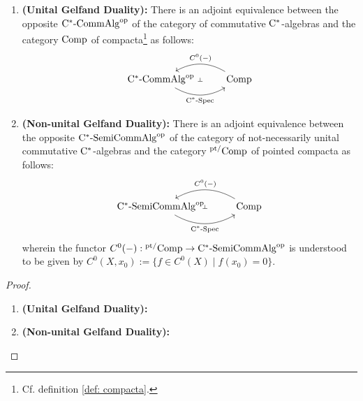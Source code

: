             \begin{theorem} \label{theorem: gelfand_duality}
                \noindent
                \begin{enumerate}
                    \item \textbf{(Unital Gelfand Duality):} There is an adjoint equivalence between the opposite $\mathrm{C}^*\text{-}\mathrm{Comm}\mathrm{Alg}^{\mathrm{op}}$ of the category of commutative $\mathrm{C}^*$-algebras and the category $\mathrm{Comp}$ of compacta\footnote{Cf. definition \ref{def: compacta}.} as follows:
                        $$
                            \begin{tikzcd}
                            	{\rmC^*\-\Comm\Alg^{\op}} & \Comp
                            	\arrow[""{name=0, anchor=center, inner sep=0}, "{\rmC^*\-\Spec}"', bend right, from=1-1, to=1-2]
                            	\arrow[""{name=1, anchor=center, inner sep=0}, "{C^0(-)}"', bend right, from=1-2, to=1-1]
                            	\arrow["\dashv"{anchor=center, rotate=-90}, draw=none, from=1, to=0]
                            \end{tikzcd}
                        $$
                    \item \textbf{(Non-unital Gelfand Duality):} There is an adjoint equivalence between the opposite $\mathrm{C}^*\text{-}\mathrm{Semi}\mathrm{Comm}\mathrm{Alg}^{\mathrm{op}}$ of the category of not-necessarily unital commutative $\mathrm{C}^*$-algebras and the category ${}^{\mathrm{pt}/}\mathrm{Comp}$ of pointed compacta as follows:
                        $$
                            \begin{tikzcd}
                            	{\rmC^*\-\Semi\Comm\Alg^{\op}} & { \Comp}
                            	\arrow[""{name=0, anchor=center, inner sep=0}, "{\rmC^*\-\Spec}"', bend right, from=1-1, to=1-2]
                            	\arrow[""{name=1, anchor=center, inner sep=0}, "{C^0(-)}"', bend right, from=1-2, to=1-1]
                            	\arrow["\dashv"{anchor=center, rotate=-90}, draw=none, from=1, to=0]
                            \end{tikzcd}
                        $$
                    wherein the functor $C^0(-): {}^{\mathrm{pt}/}\mathrm{Comp} \to \mathrm{C}^*\text{-}\mathrm{Semi}\mathrm{Comm}\mathrm{Alg}^{\mathrm{op}}$ is understood to be given by $C^0(X, x_0) := \{f \in C^0(X) \mid f(x_0) = 0\}$.
                \end{enumerate}
            \end{theorem}
                \begin{proof}
                    \noindent
                    \begin{enumerate}
                        \item \textbf{(Unital Gelfand Duality):} 
                        \item \textbf{(Non-unital Gelfand Duality):} 
                    \end{enumerate}
                \end{proof}
            
